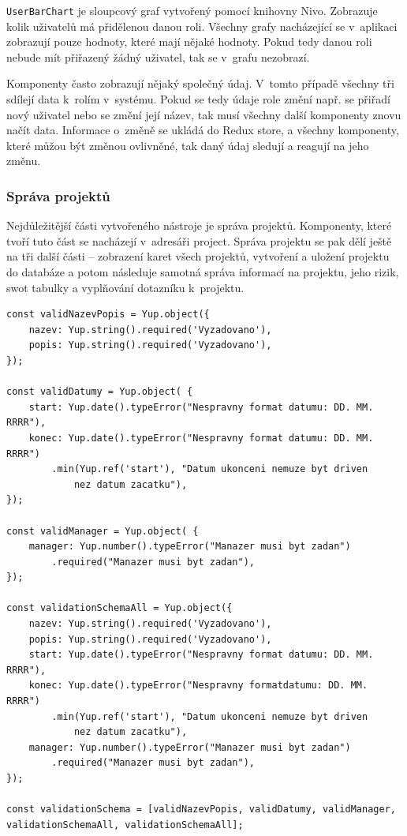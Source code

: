 \texttt{UserBarChart} je sloupcový graf vytvořený pomocí knihovny Nivo. Zobrazuje kolik uživatelů má přidělenou danou roli. Všechny grafy nacházející se v~aplikaci zobrazují pouze hodnoty, které mají nějaké hodnoty. Pokud tedy danou roli nebude mít přiřazený žádný uživatel, tak se v~grafu nezobrazí.

Komponenty často zobrazují nějaký společný údaj. V~tomto případě všechny tři sdílejí data k~rolím v~systému. Pokud se tedy údaje role změní např. se přiřadí nový uživatel nebo se změní její název, tak musí všechny další komponenty znovu načít data. Informace o~změně se ukládá do Redux store, a všechny komponenty, které můžou být změnou ovlivněné, tak daný údaj sledují a reagují na jeho změnu.


\subsubsection *{Správa projektů}

Nejdůležitější části vytvořeného nástroje je správa projektů. Komponenty, které tvoří tuto část se nacházejí v~adresáři project. Správa projektu se pak dělí ještě na tři další části – zobrazení karet všech projektů, vytvoření a uložení projektu do databáze a potom následuje samotná správa informací na projektu, jeho rizik, swot tabulky a vyplňování dotazníku k~projektu.

\begin{lstlisting}[caption={Části validačního schématu formuláře pro tvorbu projektu \text{[}zdroj vlastní\text{]}},captionpos=b,frame=single,label=validaceSchema]
const validNazevPopis = Yup.object({
    nazev: Yup.string().required('Vyzadovano'),
    popis: Yup.string().required('Vyzadovano'),
});

const validDatumy = Yup.object( {
    start: Yup.date().typeError("Nespravny format datumu: DD. MM. RRRR"),
    konec: Yup.date().typeError("Nespravny format datumu: DD. MM. RRRR")
        .min(Yup.ref('start'), "Datum ukonceni nemuze byt driven 
            nez datum zacatku"),
});

const validManager = Yup.object( {
    manager: Yup.number().typeError("Manazer musi byt zadan")
        .required("Manazer musi byt zadan"),
});

const validationSchemaAll = Yup.object({
    nazev: Yup.string().required('Vyzadovano'),
    popis: Yup.string().required('Vyzadovano'),
    start: Yup.date().typeError("Nespravny format datumu: DD. MM. RRRR"),
    konec: Yup.date().typeError("Nespravny formatdatumu: DD. MM. RRRR")
        .min(Yup.ref('start'), "Datum ukonceni nemuze byt driven 
            nez datum zacatku"),
    manager: Yup.number().typeError("Manazer musi byt zadan")
        .required("Manazer musi byt zadan"),
});

const validationSchema = [validNazevPopis, validDatumy, validManager, 
validationSchemaAll, validationSchemaAll];
\end{lstlisting}

